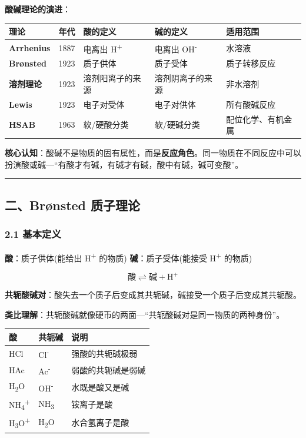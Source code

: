 \textbf{酸碱理论的演进}：

{\def\LTcaptype{none} %
\begin{longtable}[]{@{}lclll@{}}
\toprule\noalign{}
理论 & 年代 & 酸的定义 & 碱的定义 & 适用范围 \\
\midrule\noalign{}
\endhead
\bottomrule\noalign{}
\endlastfoot
\textbf{Arrhenius} & 1887 & 电离出 H\textsuperscript{+} & 电离出 OH\textsuperscript{-} & 水溶液 \\
\textbf{Brønsted} & 1923 & 质子供体 & 质子受体 & 质子转移反应 \\
\textbf{溶剂理论} & 1923 & 溶剂阳离子的来源 & 溶剂阴离子的来源 & 非水溶剂 \\
\textbf{Lewis} & 1923 & 电子对受体 & 电子对供体 & 所有酸碱反应 \\
\textbf{HSAB} & 1963 & 软/硬酸分类 & 软/硬碱分类 & 配位化学、有机金属 \\
\end{longtable}
}

\textbf{核心认知}：酸碱不是物质的固有属性，而是\textbf{反应角色}。同一物质在不同反应中可以扮演酸或碱---``有酸才有碱，有碱才有碱，酸中有碱，碱可变酸''。

\begin{center}\rule{0.5\linewidth}{0.5pt}\end{center}

\subsection{二、Brønsted 质子理论}\label{ux4e8cbruxf8nsted-ux8d28ux5b50ux7406ux8bba}

\subsubsection{2.1 基本定义}\label{ux57faux672cux5b9aux4e49}

\textbf{酸}：质子供体(能给出 H\textsuperscript{+} 的物质)
\textbf{碱}：质子受体(能接受 H\textsuperscript{+} 的物质)

\[
\text{酸} \rightleftharpoons \text{碱} + \mathrm{H}^+
\]

\textbf{共轭酸碱对}：酸失去一个质子后变成其共轭碱，碱接受一个质子后变成其共轭酸。

\textbf{类比理解}：共轭酸碱就像硬币的两面---``共轭酸碱对是同一物质的两种身份''。

{\def\LTcaptype{none} %
\begin{longtable}[]{@{}lll@{}}
\toprule\noalign{}
酸 & 共轭碱 & 说明 \\
\midrule\noalign{}
\endhead
\bottomrule\noalign{}
\endlastfoot
HCl & Cl\textsuperscript{-} & 强酸的共轭碱极弱 \\
HAc & Ac\textsuperscript{-} & 弱酸的共轭碱是弱碱 \\
H\textsubscript{2}O & OH\textsuperscript{-} & 水既是酸又是碱 \\
NH\textsubscript{4}\textsuperscript{+} & NH\textsubscript{3} & 铵离子是酸 \\
H\textsubscript{3}O\textsuperscript{+} & H\textsubscript{2}O & 水合氢离子是酸 \\
\end{longtable}
}

